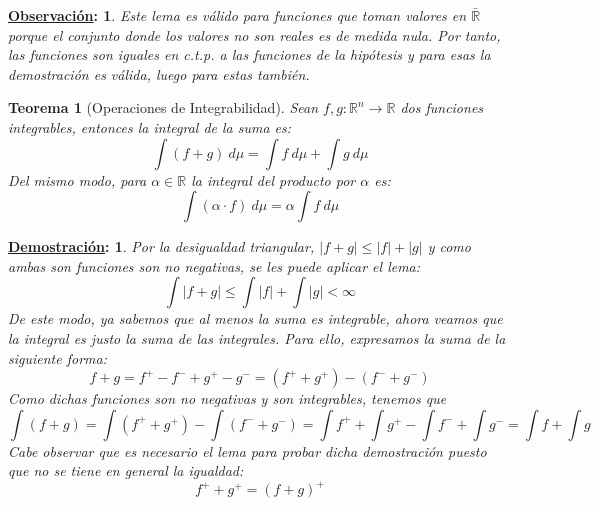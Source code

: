 \documentclass[10pt,a4paper,openright]{book}
\theoremstyle{break}
\newtheorem*{theo}{Teorema}
\newtheorem*{demo}{\underline{Demostración}:}
\newtheorem*{obs}{\underline{Observación}:}
\newcommand{\dif}[1]{\ d#1}
\begin{document}
\begin{obs}
Este lema es válido para funciones que toman valores en $\bar{\mathbb{R}}$ porque el conjunto donde los valores no son reales es de medida nula. Por tanto, las funciones son iguales en c.t.p. a las funciones de la hipótesis y para esas la demostración es válida, luego para estas también.
\end{obs}

\begin{theo}[Operaciones de Integrabilidad]
Sean $f,g: \mathbb{R}^n \rightarrow \mathbb{R}$ dos funciones integrables, entonces la integral de la suma es:
$$\int (f+g) \dif{\mu} = \int f \dif{\mu} + \int g \dif{\mu}$$
Del mismo modo, para $\alpha \in \mathbb{R}$ la integral del producto por $\alpha$ es:
$$\int (\alpha \cdot f) \dif{\mu} = \alpha \int f \dif{\mu}$$
\end{theo}
\begin{demo}
Por la desigualdad triangular, $|f+g|\leq |f| + |g|$ y como ambas son funciones son no negativas, se les puede aplicar el lema:
$$\int |f+g| \leq \int |f| + \int |g| < \infty $$
De este modo, ya sabemos que al menos la suma es integrable, ahora veamos que la integral es justo la suma de las integrales. Para ello, expresamos la suma de la siguiente forma:
$$f+ g = f^+ - f^- + g^+ - g^- = (f^+ + g^+) - (f^- + g^-)$$
Como dichas funciones son  no negativas y son integrables, tenemos que
$$\int (f+g) = \int (f^+ + g^+) - \int (f^- + g^- ) = \int f^+ + \int g^+ - \int f^- +\int g^-  = \int f + \int g$$
Cabe observar que es necesario el lema para probar dicha demostración puesto que no se tiene en general la igualdad:
$$f^+ + g^+ = (f+g)^+$$
\end{demo}
\end{document}
